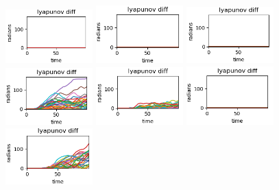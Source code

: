 \documentclass[11pt]{article} %
\begin{document}
    \begin{figure}[H]
        \centering
        \includegraphics[width=0.3\textwidth]{lya_0.5_0.5.png}
        \includegraphics[width=0.3\textwidth]{lya_0.5_1.0.png}
        \includegraphics[width=0.3\textwidth]{lya_0.5_2.0.png}
        \includegraphics[width=0.3\textwidth]{lya_1.0_0.5.png}
        \includegraphics[width=0.3\textwidth]{lya_1.0_1.0.png}
        \includegraphics[width=0.3\textwidth]{lya_1.0_2.0.png}
        \includegraphics[width=0.3\textwidth]{lya_2.0_0.5.png}

\end{figure}
\end{document}
